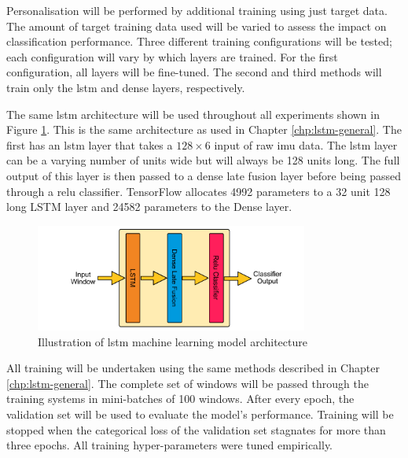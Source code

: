 Personalisation will be performed by additional training using just target data. The amount of target training data used will be varied to assess the impact on classification performance. Three different training configurations will be tested; each configuration will vary by which layers are trained. For the first configuration, all layers will be fine-tuned. The second and third methods will train only the \acrshort{lstm} and dense layers, respectively.

The same \acrshort{lstm} architecture will be used throughout all experiments shown in Figure \ref{fig:ch5_illustration_of_base_LSTM_model}. This is the same architecture as used in Chapter \ref{chp:lstm-general}. The first has an \acrshort{lstm} layer that takes a $128 \times 6$ input of raw \acrshort{imu} data. The \acrshort{lstm} layer can be a varying number of units wide but will always be 128 units long. The full output of this layer is then passed to a dense late fusion layer before being passed through a \acrshort{relu} classifier. TensorFlow allocates 4992 parameters to a 32 unit 128 long LSTM layer and 24582 parameters to the Dense layer.

\begin{figure}[htbp]
    \centering
    \includegraphics[width=0.8\textwidth]{content/5-Personalisation/ch5_lstm_architecture.pdf}
    \caption[Illustration of  machine learning model architecture]{Illustration of \acrshort{lstm} machine learning model architecture}
    \label{fig:ch5_illustration_of_base_LSTM_model}
\end{figure}

All training will be undertaken using the same methods described in Chapter \ref{chp:lstm-general}. The complete set of windows will be passed through the training systems in mini-batches of 100 windows. After every epoch, the validation set will be used to evaluate the model's performance. Training will be stopped when the categorical loss of the validation set stagnates for more than three epochs. All training hyper-parameters were tuned empirically.

